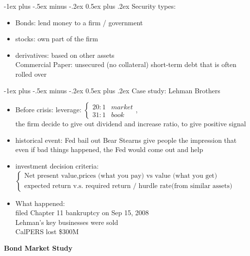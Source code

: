 \documentclass[10pt,landscape]{article}
\makeatletter
\renewcommand{\section}{\@startsection{section}{1}{0mm}%
                                {-1ex plus -.5ex minus -.2ex}%
                                {0.5ex plus .2ex}%
                                {\normalfont\large\bfseries}}
\makeatother
\begin{document}
\begin{multicols}{2}
\section{Security types:}
\begin{itemize}
	\item Bonds: lend money to a firm / government
	\item stocks: own part of the firm
	\item derivatives: based on other assets\\
		Commercial Paper: unsecured (no collateral) short-term debt that is often rolled over
\end{itemize}

\section{Case study: Lehman Brothers}
\begin{itemize}
	\item Before crisis: leverage: $\begin{cases}
		20:1 & market\\
		31:1 & book
	\end{cases}$, \\the firm decide to give out dividend and increase ratio, to give positive signal
	\item historical event: Fed bail out Bear Stearns give people the impression that even if bad things happened, the Fed would come out and help
	\item investment decision criteria:$\begin{cases}
		\text{Net present value} , \text{prices (what you pay) vs value (what you get)}\\
		\text{expected return v.s. required return / hurdle rate(from similar assets)} 
	\end{cases}$
	\item What happened: \\
		filed Chapter 11 bankruptcy on Sep 15, 2008\\
		Lehman's key businesses were sold\\
		CalPERS lost \$300M
\end{itemize}
	
\end{multicols}




\newpage

\begin{center}
     \Large{\textbf{Bond Market Study}} \\
\end{center}
\end{document}
